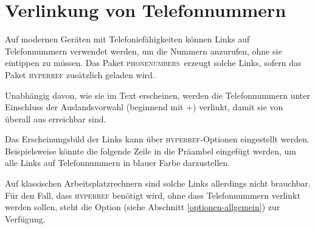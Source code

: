 \documentclass[numbers=noenddot]{scrreprt}
\newcommand*{\Paket}[1]{\textsc{#1}}
\newcommand{\phone}{\textcolor{cnltx}{\Paket{phone\-numbers}}}
\newcommand*{\sieheAbschnitt}[1]{(siehe Abschnitt \ref{#1})}
\begin{document}
\section{Verlinkung von Telefonnummern} \label{verlinkung}
Auf modernen Geräten mit Telefoniefähigkeiten können Links auf Telefonnummern verwendet werden, um die Nummern anzurufen, ohne sie eintippen zu müssen. Das Paket \phone\ erzeugt solche Links, sofern das Paket \Paket{hyperref}
\cite{hyperref}
zusätzlich geladen wird.

Unabhängig davon, wie sie im Text erscheinen, werden die Telefonnummern unter Einschluss der Auslandsvorwahl (beginnend mit +) verlinkt, damit sie von überall aus erreichbar sind.

Das Erscheinungsbild der Links kann über \Paket{hyperref}-Optionen eingestellt werden. Beispielsweise könnte die folgende Zeile in die Präambel eingefügt werden, um alle Links auf Telefonnummern in blauer Farbe darzustellen.

\begin{sourcecode}
  \usepackage[colorlinks=true,urlcolor=blue]{hyperref}
\end{sourcecode}

Auf klassischen Arbeitsplatzrechnern sind solche Links allerdings nicht brauchbar. Für den Fall, dass \Paket{hyperref} benötigt wird, ohne dass Telefonnummern verlinkt werden sollen, steht die Option 
\sieheAbschnitt{optionen-allgemein} zur Verfügung.
\end{document}
